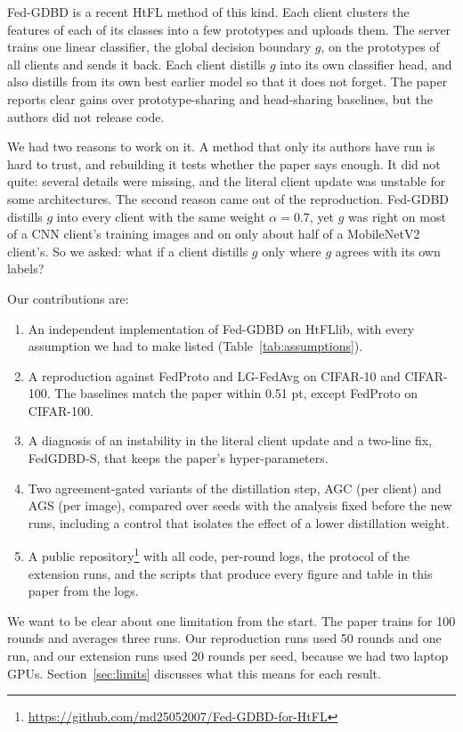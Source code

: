 \documentclass[conference]{IEEEtran}
\begin{document}
Fed-GDBD \cite{zhang2025gdbd} is a recent HtFL method of this kind. Each client clusters the features of each of its classes into a few prototypes and uploads them. The server trains one linear classifier, the global decision boundary $g$, on the prototypes of all clients and sends it back. Each client distills $g$ into its own classifier head, and also distills from its own best earlier model so that it does not forget. The paper reports clear gains over prototype-sharing and head-sharing baselines, but the authors did not release code.

We had two reasons to work on it. A method that only its authors have run is hard to trust, and rebuilding it tests whether the paper says enough. It did not quite: several details were missing, and the literal client update was unstable for some architectures. The second reason came out of the reproduction. Fed-GDBD distills $g$ into every client with the same weight $\alpha=0.7$, yet $g$ was right on most of a CNN client's training images and on only about half of a MobileNetV2 client's. So we asked: what if a client distills $g$ only where $g$ agrees with its own labels?

Our contributions are:
\begin{enumerate}
\item An independent implementation of Fed-GDBD on HtFLlib, with every assumption we had to make listed (Table~\ref{tab:assumptions}).
\item A reproduction against FedProto and LG-FedAvg on CIFAR-10 and CIFAR-100. The baselines match the paper within 0.51 pt, except FedProto on CIFAR-100.
\item A diagnosis of an instability in the literal client update and a two-line fix, FedGDBD-S, that keeps the paper's hyper-parameters.
\item Two agreement-gated variants of the distillation step, AGC (per client) and AGS (per image), compared over \NSeeds{} seeds with the analysis fixed before the new runs, including a control that isolates the effect of a lower distillation weight.
\item A public repository\footnote{\url{https://github.com/md25052007/Fed-GDBD-for-HtFL}} with all code, per-round logs, the protocol of the extension runs, and the scripts that produce every figure and table in this paper from the logs.
\end{enumerate}

We want to be clear about one limitation from the start. The paper trains for 100 rounds and averages three runs. Our reproduction runs used 50 rounds and one run, and our extension runs used 20 rounds per seed, because we had two laptop GPUs. Section~\ref{sec:limits} discusses what this means for each result.
\end{document}
